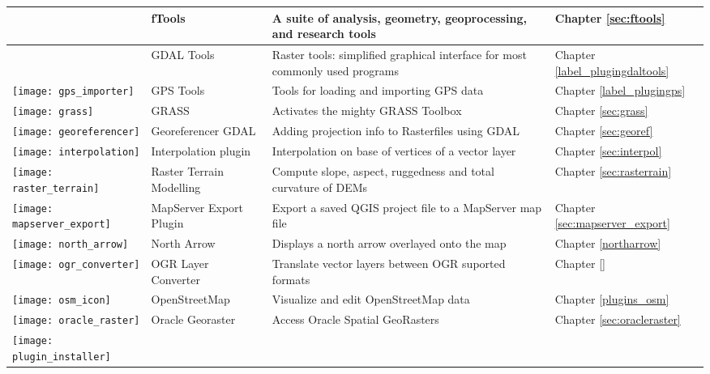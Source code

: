 {\begin{longtable}{|p{1.2cm}|p{3.8cm}|p{7.5cm}|p{3cm}|}
 & fTools \index{plugins!ftools}& A suite of analysis, geometry, geoprocessing, and research tools & Chapter \ref{sec:ftools}\\
\hline
 & GDAL Tools \index{plugins!gdaltools} & Raster tools: simplified graphical interface for most commonly used programs & Chapter \ref{label_plugingdaltools}\\
\hline
\texttt{[image: gps\_importer]}
 & GPS Tools \index{plugins!gps}& Tools for loading and importing GPS data & Chapter \ref{label_plugingps}\\
\hline
\texttt{[image: grass]}
 & GRASS \index{plugin!grass toolbox} & Activates the mighty GRASS Toolbox & Chapter \ref{sec:grass}\\
\hline
\texttt{[image: georeferencer]}
 & Georeferencer GDAL \index{plugin!georeferencer} & Adding projection info to Rasterfiles using GDAL & Chapter \ref{sec:georef}\\
\hline
\texttt{[image: interpolation]}
& Interpolation plugin \index{plugins!Interpolation}& Interpolation on base of vertices of a vector layer & Chapter \ref{sec:interpol}\\
\hline
\texttt{[image: raster\_terrain]}
& Raster Terrain Modelling \index{plugins!Raster Terrain Modelling}& Compute slope, aspect,
ruggedness and total curvature of DEMs & Chapter \ref{sec:rasterrain}\\
\hline
\texttt{[image: mapserver\_export]}
& MapServer Export Plugin \index{plugins!MapServer Export}& Export a saved QGIS project file to a MapServer map file & Chapter \ref{sec:mapserver_export} \\
\hline
\texttt{[image: north\_arrow]}
& North Arrow \index{plugins!north arrow}& Displays a north arrow overlayed onto the map & Chapter \ref{northarrow}\\
\hline
\texttt{[image: ogr\_converter]}
 & OGR Layer Converter \index{plugins!OGR converter} & Translate vector
layers between OGR suported formats & Chapter \ref{}\\
\hline
\texttt{[image: osm\_icon]}
 & OpenStreetMap & Visualize and edit OpenStreetMap data & Chapter \ref{plugins_osm}\\
\hline
\texttt{[image: oracle\_raster]}
 & Oracle Georaster \index{plugins!georaster}& Access Oracle Spatial GeoRasters & Chapter 
\ref{sec:oracleraster}\\
\hline
\texttt{[image: plugin\_installer]}

\end{longtable}}
